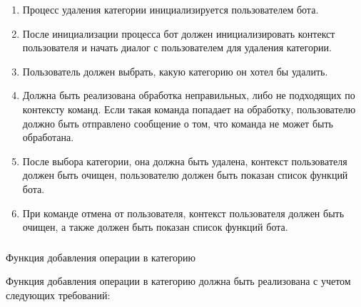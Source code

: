 \begin{enumerate}
	\item Процесс удаления категории инициализируется пользователем бота.
	\item После инициализации процесса бот должен инициализировать контекст пользователя и начать диалог с пользователем для удаления категории.
	\item Пользователь должен выбрать, какую категорию он хотел бы удалить.
	\item Должна быть реализована обработка неправильных, либо не подходящих по контексту команд. Если такая команда попадает на обработку, пользователю должно быть отправлено сообщение о том, что команда не может быть обработана.
	\item После выбора категории, она должна быть удалена, контекст пользователя должен быть очищен, пользователю должен быть показан список функций бота.
	\item При команде отмена от пользователя, контекст пользователя должен быть очищен, а также должен быть показан список функций бота.
\end{enumerate}

\subsubsection{} Функция добавления операции в категорию
\label{sec:domain:specification:addoperationtocategory}

Функция добавления операции в категорию должна быть реализована с учетом следующих требований:

